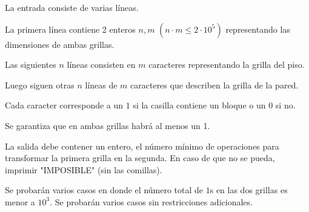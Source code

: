 \documentclass{oci}
\begin{document}
\begin{inputDescription}
La entrada consiste de varias líneas.

La primera línea contiene 2 enteros $n, m$ $(n \cdot m \leq 2 \cdot 10^5)$ representando las dimensiones de ambas grillas.

Las siguientes $n$ líneas consisten en $m$ caracteres representando la grilla del piso.

Luego siguen otras $n$ líneas de $m$ caracteres que describen la grilla de la pared.

Cada caracter corresponde a un $1$ si la casilla contiene un bloque o un $0$ si no.

Se garantiza que en ambas grillas habrá al menos un 1.
\end{inputDescription}

\begin{outputDescription}
La salida debe contener un entero, el número mínimo de operaciones para transformar la primera grilla en la segunda. En caso de que no se pueda, imprimir "IMPOSIBLE" (sin las comillas).
\end{outputDescription}

\begin{scoreDescription}
  Se probarán varios casos en donde el número total de $1$s en las dos grillas es menor a $10^3$.
  Se probarán varios casos sin restricciones adicionales.
\end{scoreDescription}

\begin{sampleDescription}
\end{sampleDescription}
\end{document}
